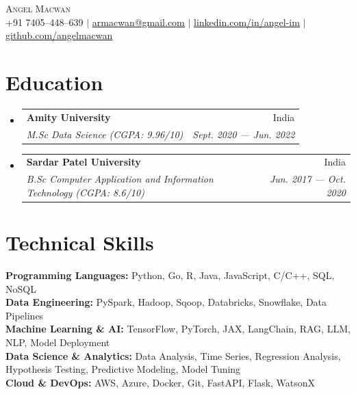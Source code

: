 \documentclass[a4paper,11pt]{article}
\makeatletter
\newcommand{\resumeSubheading}[4]{
  \vspace{-2pt}\item
    \begin{tabular*}{0.97\textwidth}[t]{l@{\extracolsep{\fill}}r}
      \textbf{#1} & #2 \\
      \textit{\small#3} & \textit{\small#4} \\
    \end{tabular*}\vspace{-7pt}
}
\newcommand{\sectionSpacing}{\vspace{-10pt}}
\newcommand{\resumeSubHeadingListStart}{\begin{itemize}[leftmargin=0.15in, label={}]}
\newcommand{\resumeSubHeadingListEnd}{\end{itemize}}
\makeatother
\begin{document}

\begin{center}
    {\Huge\scshape Angel Macwan} \\ \vspace{1pt}
    \small +91 7405--448--639 $|$ \href{mailto:armacwan@gmail.com}{\underline{armacwan@gmail.com}} $|$ 
    \href{https://linkedin.com/in/angel-im}{\underline{linkedin.com/in/angel-im}} $|$
    \href{https://github.com/angelmacwan}{\underline{github.com/angelmacwan}}
\end{center}


\section{Education}
  \resumeSubHeadingListStart{}
    \resumeSubheading
      {Amity University}{India}
      {M.Sc Data Science (CGPA: 9.96/10)}{Sept. 2020 --- Jun. 2022}
    \resumeSubheading
      {Sardar Patel University}{India}
      {B.Sc Computer Application and Information Technology (CGPA: 8.6/10)}{Jun. 2017 --- Oct. 2020}
  \resumeSubHeadingListEnd{}
\sectionSpacing

\section{Technical Skills}
 \begin{itemize}[leftmargin=0.15in, label={}]
    \small{\item{
    \textbf{Programming Languages:} Python, Go, R, Java, JavaScript, C/C++, SQL, NoSQL \\
    \textbf{Data Engineering:} PySpark, Hadoop, Sqoop, Databricks, Snowflake, Data Pipelines \\
    \textbf{Machine Learning \& AI:} TensorFlow, PyTorch, JAX, LangChain, RAG, LLM, NLP, Model Deployment \\
    \textbf{Data Science \& Analytics:} Data Analysis, Time Series, Regression Analysis, Hypothesis Testing, Predictive Modeling, Model Tuning \\
    \textbf{Cloud \& DevOps:} AWS, Azure, Docker, Git, FastAPI, Flask, WatsonX
}}
 \end{itemize}
\sectionSpacing
\end{document}
